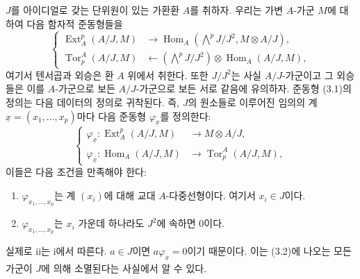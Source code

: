 
$J$를 아이디얼로 갖는 단위원이 있는 가환환 $A$를 취하자. 우리는
가변 $A$-가군 $M$에 대하여 다음 함자적 준동형들을
\begin{equation}\tag{3.1}
\left\{
\begin{aligned}
\operatorname{Ext}_{A}^{p}(A/J,M)
  &\longrightarrow
  \operatorname{Hom}_{A}\!\left(\bigwedge^{p}J/J^{2},M\otimes A/J\right),\\
\operatorname{Tor}_{p}^{A}(A/J,M)
  &\longleftarrow
  \left(\bigwedge^{p}J/J^{2}\right)
  \otimes\operatorname{Hom}_{A}(A/J,M),
\end{aligned}
\right.
\end{equation}
여기서 텐서곱과 외승은 환 $A$ 위에서 취한다. 또한
$J/J^{2}$는 사실 $A/J$-가군이고 그
외승들은 이를 $A$-가군으로 보든 $A/J$-가군으로 보든 서로 같음에 유의하자.
준동형 (3.1)의 정의는 다음 데이터의 정의로 귀착된다. 즉,
$J$의 원소들로 이루어진 임의의 계 $\underline{x}=(x_1,\ldots,x_p)$마다
다음 준동형 $\varphi_{\underline{x}}$를 정의한다:
\begin{equation}\tag{3.2}
\left\{
\begin{aligned}
\varphi_{\underline{x}}:
  \operatorname{Ext}_{A}^{p}(A/J,M)&\longrightarrow M\otimes A/J,\\
\varphi_{\underline{x}}:
  \operatorname{Hom}_{A}(A/J,M)&\longrightarrow
  \operatorname{Tor}_{p}^{A}(A/J,M),
\end{aligned}
\right.
\end{equation}
이들은 다음 조건을 만족해야 한다:

\begin{enumerate}
\item[\textup{i.}] $\varphi_{x_1,\ldots,x_p}$는
계 $(x_i)$에 대해 교대 $A$-다중선형이다. 여기서 $x_i\in J$이다.
\item[\textup{ii.}] $\varphi_{x_1,\ldots,x_p}$는 $x_i$ 가운데 하나라도
$J^{2}$에 속하면 $0$이다.
\end{enumerate}
실제로 ii는 i에서 따른다. $a\in J$이면 $a\varphi_{\underline{x}}=0$이기 때문이다.
이는 (3.2)에 나오는 모든 가군이
$J$에 의해 소멸된다는 사실에서 알 수 있다.

